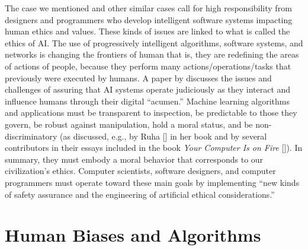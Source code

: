 The case we mentioned and other similar cases call for high responsibility from designers and programmers who develop intelligent software systems impacting human ethics and values. These kinds of issues are linked to what is called the ethics of AI. The use of progressively intelligent algorithms, software systems, and networks is changing the frontiers of human that is, they are redefining the areas of actions of people, because they perform many actions/operations/tasks that previously were executed by humans. A paper by \citet{chap:7:BostromandYudkowsky:2014} discusses the issues and challenges of assuring that AI systems operate judiciously as they interact and influence humans through their digital ``acumen.'' Machine learning algorithms and applications must be transparent to inspection, be predictable to those they govern, be robust against manipulation, hold a moral status, and be non-discriminatory (as discussed, e.g., by Ruha \citeauthor{chap:7:Benjamin:2019} \mbox{[\citeyear{chap:7:Benjamin:2019}]} in her book and by several contributors in their essays included in the book \textit{Your Computer Is on Fire} [\citealt{chap:7:Mullaneyetal:2021}]). In summary, they must embody a moral behavior that corresponds to our civilization's ethics. \hbox{Computer} scientists, software designers, and computer programmers must operate toward these main goals by implementing ``new kinds of safety assurance and the engineering of artificial ethical considerations.''

\section{\label{sec:7.2}Human Biases and Algorithms}

